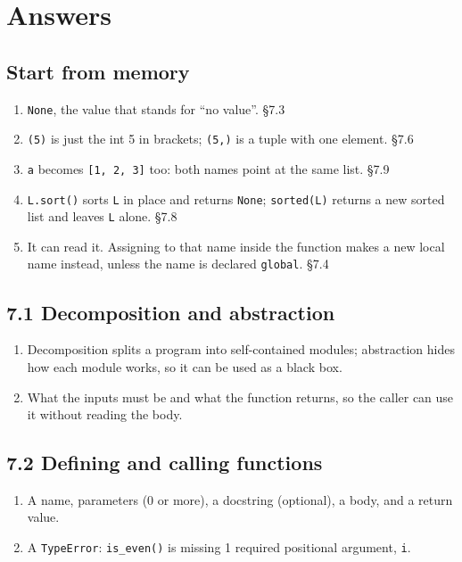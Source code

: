 \documentclass[11pt]{article}
\begin{document}
\clearpage
\section{Answers}
\begin{keepsection}\subsection{Start from memory}

\begin{enumerate}
\item \texttt{None}, the value that stands for “no value”. \hfill{\small\color{FAUblue}§7.3}
\item \texttt{(5)} is just the int 5 in brackets; \texttt{(5,)} is a tuple with one element. \hfill{\small\color{FAUblue}§7.6}
\item \texttt{a} becomes \texttt{[1, 2, 3]} too: both names point at the same list. \hfill{\small\color{FAUblue}§7.9}
\item \texttt{L.sort()} sorts \texttt{L} in place and returns \texttt{None}; \texttt{sorted(L)} returns a new sorted list and leaves \texttt{L} alone. \hfill{\small\color{FAUblue}§7.8}
\item It can read it. Assigning to that name inside the function makes a new local name instead, unless the name is declared \texttt{global}. \hfill{\small\color{FAUblue}§7.4}
\end{enumerate}

\end{keepsection}
\begin{keepsection}\subsection{7.1 Decomposition and abstraction}

\begin{enumerate}
\item Decomposition splits a program into self-contained modules; abstraction hides how each module works, so it can be used as a black box.
\item What the inputs must be and what the function returns, so the caller can use it without reading the body.
\end{enumerate}

\end{keepsection}
\begin{keepsection}\subsection{7.2 Defining and calling functions}

\begin{enumerate}
\item A name, parameters (0 or more), a docstring (optional), a body, and a return value.
\item A \texttt{TypeError}: \texttt{is\_even()} is missing 1 required positional argument, \texttt{i}.
\end{enumerate}

\end{keepsection}
\end{document}
